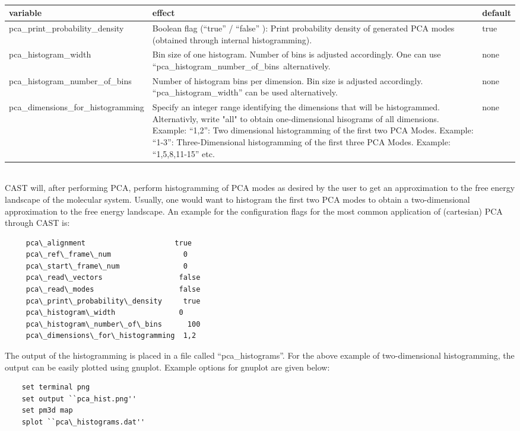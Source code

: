 \documentclass[10pt,a4paper]{article} %
\begin{document}
		~\\
		\begin{longtable}{|p{5.1cm}|p{5cm}|p{1cm}|}
		variable & effect & default\\
		\hline
		pca\_print\_probability\_density & Boolean flag (``true'' / ``false'' ): Print probability density of generated PCA modes (obtained through internal histogramming). & true\\
		pca\_histogram\_width & Bin size of one histogram. Number of bins is adjusted accordingly. One can use ``pca\_histogram\_number\_of\_bins\ alternatively. & none\\
		pca\_histogram\_number\_of\_bins & Number of histogram bins per dimension. Bin size is adjusted accordingly. ``pca\_histogram\_width'' can be used alternatively. & none\\
		pca\_dimensions\_for\_histogramming & Specify an integer range identifying the dimensions that will be histogrammed. Alternativly, write "all" to obtain one-dimensional hisograms of all dimensions. Example: ``1,2'': Two dimensional histogramming of the first two \ac{PCA} Modes. Example: ``1-3'': Three-Dimensional histogramming of the first three \ac{PCA} Modes. Example: ``1,5,8,11-15'' etc.& none\\
		
	\end{longtable}~\\
		
	 \ac{CAST} will, after performing \ac{PCA}, perform histogramming of \ac{PCA} modes as desired by the user to get an approximation to the free energy landscape of the molecular system. Usually, one would want to histogram the first two \ac{PCA} modes to obtain a two-dimensional approximation to the free energy landscape. An example for the configuration flags for the most common application of (cartesian) \ac{PCA} through \ac{CAST} is:\\
	 
	 \begin{lstlisting}
	 pca\_alignment                     true
	 pca\_ref\_frame\_num                 0
	 pca\_start\_frame\_num               0
	 pca\_read\_vectors                  false
	 pca\_read\_modes                    false
	 pca\_print\_probability\_density     true
	 pca\_histogram\_width               0
	 pca\_histogram\_number\_of\_bins      100
	 pca\_dimensions\_for\_histogramming  1,2\end{lstlisting}
	 
	 The output of the histogramming is placed in a file called ``pca\_histograms''. For the above example of two-dimensional histogramming, the output can be easily plotted using gnuplot\cite{gnuplot_4.4}. Example options for gnuplot are given below:\\
	 \begin{lstlisting}
	set terminal png
	set output ``pca_hist.png''
	set pm3d map
	splot ``pca\_histograms.dat''\end{lstlisting}~\\	
	
\end{document}
